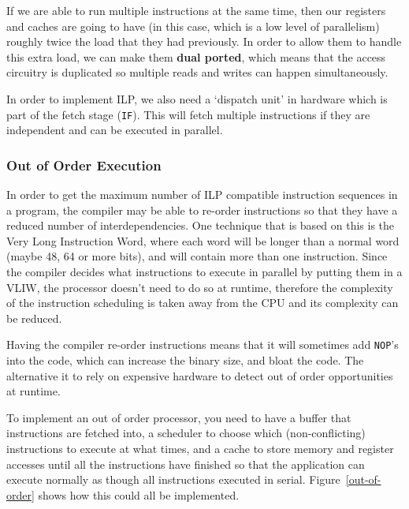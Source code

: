 
If we are able to run multiple instructions at the same time, then our registers
and caches are going to have (in this case, which is a low level of parallelism)
roughly twice the load that they had previously. In order to allow them to handle
this extra load, we can make them \textbf{dual ported}, which means that the
access circuitry is duplicated so multiple reads and writes can happen
simultaneously.

In order to implement ILP, we also need a `dispatch unit' in hardware which is
part of the fetch stage (\texttt{IF}). This will fetch multiple instructions if
they are independent and can be executed in parallel.

\subsubsection{Out of Order Execution}

In order to get the maximum number of ILP compatible instruction sequences in a
program, the compiler may be able to re-order instructions so that they have a
reduced number of interdependencies. One technique that is based on this is the
Very Long Instruction Word, where each word will be longer than a normal word
(maybe 48, 64 or more bits), and will contain more than one instruction. Since
the compiler decides what instructions to execute in parallel by putting them in
a VLIW, the processor doesn't need to do so at runtime, therefore the complexity
of the instruction scheduling is taken away from the CPU and its complexity can
be reduced.

Having the compiler re-order instructions means that it will sometimes add
\texttt{NOP}'s into the code, which can increase the binary size, and bloat the
code. The alternative it to rely on expensive hardware to detect out of order
opportunities at runtime.

To implement an out of order processor, you need to have a buffer that
instructions are fetched into, a scheduler to choose which (non-conflicting)
instructions to execute at what times, and a cache to store memory and register
accesses until all the instructions have finished so that the application can
execute normally as though all instructions executed in serial.
Figure~\ref{out-of-order} shows how this could all be implemented.

